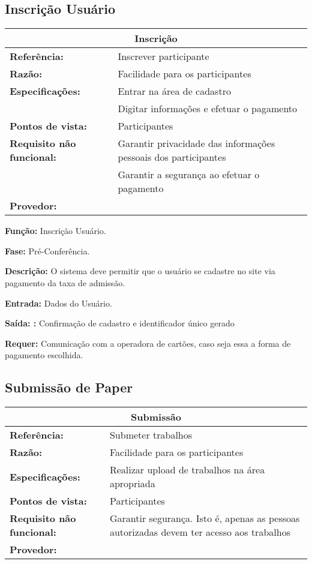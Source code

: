 \documentclass[letter]{article}
\begin{document}
\subsection{Inscrição Usuário}



%
\begin{table}[h!]\begin{center}
\begin{tabular}{|ll|}
\hline 
\multicolumn{2}{|c|}{\textbf{Inscrição}}\tabularnewline
\hline
\textbf{Referência:} & Inscrever participante\tabularnewline
\textbf{Razão:} & Facilidade para os participantes\tabularnewline
\textbf{Especificações:} & Entrar na área de cadastro\tabularnewline
 & Digitar informações e efetuar o pagamento\tabularnewline
\textbf{Pontos de vista:} & Participantes\tabularnewline
\textbf{Requisito não funcional:} & Garantir privacidade das informações pessoais dos participantes \tabularnewline
 & Garantir a segurança ao efetuar o pagamento\tabularnewline
\textbf{Provedor:} & \tabularnewline
\hline\end{tabular}\end{center}
\end{table}


\textbf{Função:} Inscrição Usuário.

\textbf{Fase: } Pré-Conferência.

\textbf{Descrição: } O sistema deve permitir que o usuário se cadastre no site via pagamento da taxa de admissão.

\textbf{Entrada: } Dados do Usuário.

\textbf{Saída: :} Confirmação de cadastro e identificador único gerado

\textbf{Requer:} Comunicação com a operadora de cartões, caso seja essa a
forma de pagamento escolhida.



\subsection{ Submissão de Paper}


%
\begin{table}[h!]\begin{center}

\begin{center}
\begin{tabular}{|ll|}
\hline 
\multicolumn{2}{|c|}{\textbf{Submissão}}\tabularnewline
\hline
\textbf{Referência:} & Submeter trabalhos\tabularnewline
\textbf{Razão:} & Facilidade para os participantes\tabularnewline
\textbf{Especificações:} & Realizar upload de trabalhos na área apropriada\tabularnewline
\textbf{Pontos de vista:} & Participantes\tabularnewline
\textbf{Requisito não funcional:} & Garantir segurança. Isto é, apenas as pessoas autorizadas devem ter
acesso aos trabalhos\tabularnewline
\textbf{Provedor:} & \tabularnewline
\hline\end{tabular}\end{center}

\end{center}
\end{table}
\end{document}
